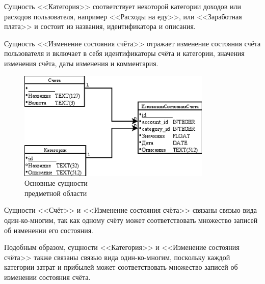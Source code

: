 Сущность <<Категория>> соответствует некоторой категории доходов или расходов
пользователя, например <<Расходы на еду>>, или <<Заработная плата>>
и состоит из названия, идентификатора и описания.

Сущность <<Изменение состояния счёта>> отражает изменение состояния счёта
пользователя и включает в себя идентификаторы счёта и категории,
значения изменения счёта, даты изменения и комментария.

\begin{figure}[h!]
  \centering
  \includegraphics[width=92mm]{pic/entities}
  \caption{Основные сущности \\ предметной области}
  \label{fig:entities}
\end{figure}

Сущности <<Счёт>> и <<Изменение состояния счёта>> связаны связью
вида один-ко-многим, так как одному счёту может соответствовать
множество записей об изменении его состояния.

Подобным образом, сущности <<Категория>> и <<Изменение состояния счёта>>
также связаны связью вида один-ко-многим, поскольку
каждой категории затрат и прибылей может соответствовать множество
записей об изменении состояния счёта.